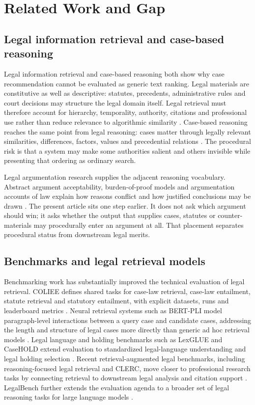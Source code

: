 \documentclass[12pt,a4paper]{article}
\begin{document}
\section{Related Work and Gap}

\subsection{Legal information retrieval and case-based reasoning}

Legal information retrieval and case-based reasoning both show why case recommendation cannot be evaluated as generic text ranking. Legal materials are constitutive as well as descriptive: statutes, precedents, administrative rules and court decisions may structure the legal domain itself. Legal retrieval must therefore account for hierarchy, temporality, authority, citations and professional use rather than reduce relevance to algorithmic similarity \citep{turtle1995,rissland1995,vanopijnen2017}. Case-based reasoning reaches the same point from legal reasoning: cases matter through legally relevant similarities, differences, factors, values and precedential relations \citep{ashley1992,benchcapon2003}. The procedural risk is that a system may make some authorities salient and others invisible while presenting that ordering as ordinary search.

Legal argumentation research supplies the adjacent reasoning vocabulary. Abstract argument acceptability, burden-of-proof models and argumentation accounts of law explain how reasons conflict and how justified conclusions may be drawn \citep{dung1995,gordon2007,prakken2015}. The present article sits one step earlier. It does not ask which argument should win; it asks whether the output that supplies cases, statutes or counter-materials may procedurally enter an argument at all. That placement separates procedural status from downstream legal merits.

\subsection{Benchmarks and legal retrieval models}

Benchmarking work has substantially improved the technical evaluation of legal retrieval. COLIEE defines shared tasks for case-law retrieval, case-law entailment, statute retrieval and statutory entailment, with explicit datasets, runs and leaderboard metrics \citep{goebel2024}. Neural retrieval systems such as BERT-PLI model paragraph-level interactions between a query case and candidate cases, addressing the length and structure of legal cases more directly than generic ad hoc retrieval models \citep{shao2020}. Legal language and holding benchmarks such as LexGLUE and CaseHOLD extend evaluation to standardized legal-language understanding and legal holding selection \citep{chalkidis2022,zheng2021}. Recent retrieval-augmented legal benchmarks, including reasoning-focused legal retrieval and CLERC, move closer to professional research tasks by connecting retrieval to downstream legal analysis and citation support \citep{zheng2025,hou2025}. LegalBench further extends the evaluation agenda to a broader set of legal reasoning tasks for large language models \citep{guha2023}.
\end{document}
